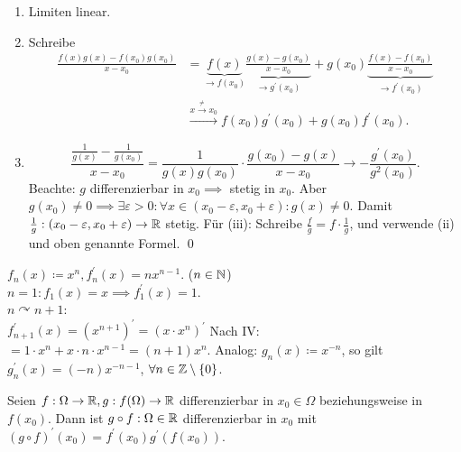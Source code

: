 \begin{subproof*}
	\begin{enumerate}[label=(\roman*)]
		\item Limiten linear.
		\item Schreibe
			\begin{align*}
				\frac{ f(x)g(x) - f(x_0)g(x_0) }{ x - x_0 } &= \underbrace{f(x)}_{\to f(x_0)} \underbrace{\frac{ g(x) - g(x_0) }{ x - x_0 } }_{\to g^\prime(x_0)} + g(x_0) \underbrace{ \frac{f(x) - f(x_0) }{ x - x_0 } }_{\to f^\prime (x_0)} \\
				~&\overset{x \overset{\neq }{\to }x_0}{\to }f(x_0)g^\prime(x_0) + g(x_0) f^\prime(x_0).
			\end{align*}
		\item 
			\[
				\frac{ \frac{ 1 }{ g(x) } - \frac{ 1 }{ g(x_0) } }{ x - x_0 } = \frac{ 1 }{ g(x)g(x_0) } \cdot \frac{ g(x_0) - g(x) }{ x - x_0 } \to - \frac{g^\prime(x_0)}{ g^2(x_0) } .
			\]
			Beachte: $ g $ differenzierbar in $ x_0 \implies $ stetig in $ x_0 $. Aber $ g(x_0) \neq 0 \implies \exists \varepsilon > 0 : \forall x \in (x_0 - \varepsilon , x_0 + \varepsilon ) : g(x) \neq 0 $. Damit $ \frac{ 1 }{ g } : (x_0 - \varepsilon , x_0 + \varepsilon ) \to \mathbb{R}  $ stetig. Für (iii): Schreibe $ \frac{ f }{ g } = f \cdot \frac{ 1 }{ g }  $, und verwende (ii) und oben genannte Formel. \qed
	\end{enumerate}
\end{subproof*}

\begin{subexample}
	$ f_n(x) \coloneqq x^n, f_n^\prime(x) = nx^{n-1}  $. ($ n \in \mathbb{N}  $)\\
	$ n = 1: f_1(x) = x \implies f_1^\prime(x) = 1 $.\\
	$ n \curvearrowright n + 1 $:\\ 
	$ f_{n+1}^\prime(x) = \left( x^{n+1}  \right)^\prime = \left( x \cdot x^n \right)^\prime $ 
	Nach IV:
	$ = 1 \cdot x^n + x \cdot n \cdot x^{n-1} = ( n + 1 ) x^n $.
	Analog: $ g_n(x) \coloneqq x^{-n}  $, so gilt $ g_n^\prime(x) = (-n)x^{-n-1}  $, $ \forall n \in \mathbb{Z} \setminus \left\{ 0 \right\}  $.
\end{subexample}

\begin{subtheorem}[Kettenregel]
	Seien $ f: \Omega \to \mathbb{R} , g : f(\Omega) \to \mathbb{R}  $ differenzierbar in $ x_0 \in \Omega $ beziehungsweise in $ f(x_0) $. Dann ist $ g \circ f : \Omega \in \mathbb{R}  $ differenzierbar in $ x_0 $ mit $ ( g \circ f )^\prime(x_0) = f^\prime(x_0)g^\prime(f(x_0)) $.
\end{subtheorem}

